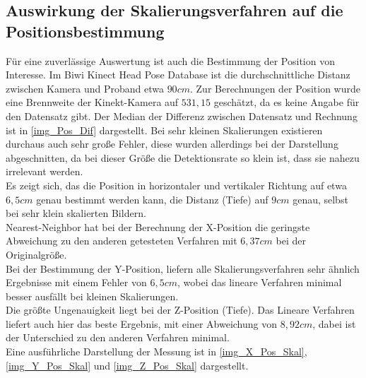 \subsection{Auswirkung der Skalierungsverfahren auf die Positionsbestimmung}
Für eine zuverlässige Auswertung ist auch die Bestimmung der Position von Interesse. Im Biwi Kinect Head Pose Database \cite{BIWI_database} ist die durchschnittliche Distanz zwischen Kamera und Proband etwa $90cm$. Zur Berechnungen der Position wurde eine Brennweite der Kinekt-Kamera auf $531,15$ geschätzt, da es keine Angabe für den Datensatz gibt. Der Median der Differenz zwischen Datensatz und Rechnung ist in \autoref{img_Pos_Dif} dargestellt. Bei sehr kleinen Skalierungen existieren durchaus auch sehr große Fehler, diese wurden allerdings bei der Darstellung abgeschnitten, da bei dieser Größe die Detektionsrate so klein ist, dass sie nahezu irrelevant werden.\\
Es zeigt sich, das die Position in horizontaler und vertikaler Richtung auf etwa $6,5cm$ genau bestimmt werden kann, die Distanz (Tiefe) auf $9cm$ genau, selbst bei sehr klein skalierten Bildern.\\
Nearest-Neighbor hat bei der Berechnung der X-Position die geringste Abweichung zu den anderen getesteten Verfahren mit $6,37cm$ bei der Originalgröße.\\
Bei der Bestimmung der Y-Position, liefern alle Skalierungsverfahren sehr ähnlich Ergebnisse mit einem Fehler von $6,5cm$, wobei das lineare Verfahren minimal besser ausfällt bei kleinen Skalierungen.\\
Die größte Ungenauigkeit liegt bei der Z-Position (Tiefe). Das Lineare Verfahren liefert auch hier das beste Ergebnis, mit einer Abweichung von $8,92cm$, dabei ist der Unterschied zu den anderen Verfahren minimal.\\
Eine ausführliche Darstellung der Messung ist in \autoref{img_X_Pos_Skal}, \autoref{img_Y_Pos_Skal} und \autoref{img_Z_Pos_Skal} dargestellt.
